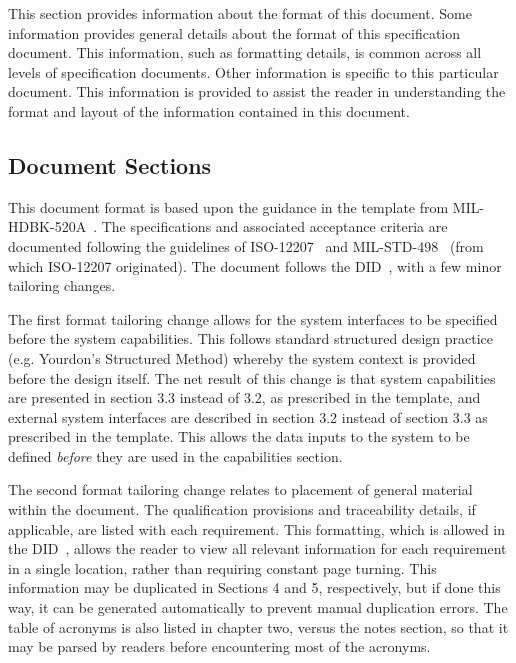 This section provides information about the format of this document.
Some information provides general details about the format of this specification document.
This information, such as formatting details, is common across all levels of specification documents.
Other information is specific to this particular document.
This information is provided to assist the reader in understanding the format and layout of the information contained in this document.

\subsection{Document Sections}
\label{ssec:Intro_DocSections}

This document format is based upon the guidance in the \SRD template from MIL-HDBK-520A~\cite{ref__MIL_HDBK_520}.
The specifications and associated acceptance criteria are documented following the guidelines of ISO-12207~\cite{ref__ISO_12207} and MIL-STD-498~\cite{ref__MIL_STD_498} (from which ISO-12207 originated).
The document follows the \SSS DID~\cite{ref__SSS_DID}, with a few minor tailoring changes.


The first format tailoring change allows for the system interfaces to be specified before the system capabilities. 
This follows standard structured design practice (e.g. Yourdon's Structured Method) whereby the system context is provided before the design itself.
The net result of this change is that system capabilities are presented in section 3.3 instead of 3.2, as prescribed in the \SSS template, and external system interfaces are described in section 3.2 instead of section 3.3 as prescribed in the \SSS template.
This allows the data inputs to the system to be defined {\em before} they are used in the capabilities section.

The second format tailoring change relates to placement of general material within the document. 
The qualification provisions and traceability details, if applicable, are listed with each requirement.
This formatting, which is allowed in the \SSS DID~\cite{ref__SSS_DID}, allows the reader to view all relevant information for each requirement in a single location, rather than requiring constant page turning.
This information may be duplicated in Sections 4 and 5, respectively, but if done this way, it can be generated automatically to prevent manual duplication errors.
The table of acronyms is also listed in chapter two, versus the notes section, so that it may be parsed by readers before encountering most of the acronyms.

